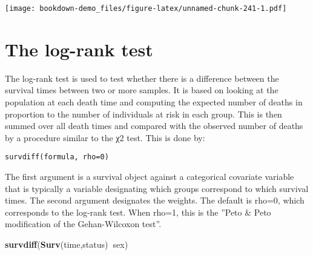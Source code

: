 \documentclass[]{book}
\newenvironment{Shaded}{\begin{snugshade}}{\end{snugshade}}
\newcommand{\KeywordTok}[1]{\textcolor[rgb]{0.13,0.29,0.53}{\textbf{#1}}}
\newcommand{\DataTypeTok}[1]{\textcolor[rgb]{0.13,0.29,0.53}{#1}}
\newcommand{\DecValTok}[1]{\textcolor[rgb]{0.00,0.00,0.81}{#1}}
\newcommand{\StringTok}[1]{\textcolor[rgb]{0.31,0.60,0.02}{#1}}
\newcommand{\OperatorTok}[1]{\textcolor[rgb]{0.81,0.36,0.00}{\textbf{#1}}}
\newcommand{\NormalTok}[1]{#1}
\theoremstyle{definition}
\theoremstyle{definition}
\theoremstyle{definition}
\theoremstyle{remark}
\begin{document}
\begin{Shaded}
\end{Shaded}

\texttt{[image: bookdown-demo\_files/figure-latex/unnamed-chunk-241-1.pdf]}

\section{The log-rank test}\label{the-log-rank-test}

The log-rank test is used to test whether there is a difference between
the survival times between two or more samples. It is based on looking
at the population at each death time and computing the expected number
of deaths in proportion to the number of individuals at risk in each
group. This is then summed over all death times and compared with the
observed number of deaths by a procedure similar to the χ2 test. This is
done by:

\begin{verbatim}
survdiff(formula, rho=0)
\end{verbatim}

The first argument is a survival object against a categorical covariate
variable that is typically a variable designating which groups
correspond to which survival times. The second argument designates the
weights. The default is rho=0, which corresponds to the log-rank test.
When rho=1, this is the ''Peto \& Peto modification of the
Gehan-Wilcoxon test''.

\begin{Shaded}
\begin{Highlighting}[]
\KeywordTok{survdiff}\NormalTok{(}\KeywordTok{Surv}\NormalTok{(time,status)}\OperatorTok{~}\NormalTok{sex)}
\end{Highlighting}
\end{Shaded}
\end{document}
